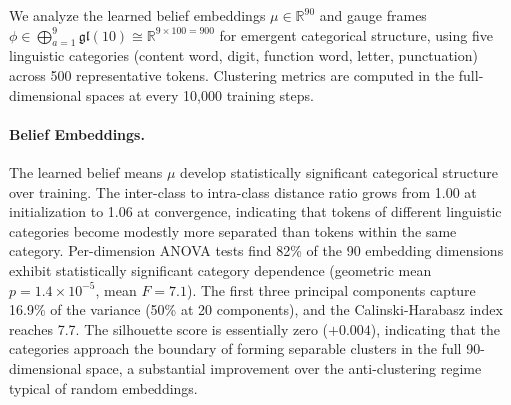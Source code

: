 \documentclass[twoside,11pt]{article}
\begin{document}
We analyze the learned belief embeddings $\mu \in \mathbb{R}^{90}$ and gauge frames $\phi \in \bigoplus_{a=1}^{9} \mathfrak{gl}(10) \cong \mathbb{R}^{9 \times 100 = 900}$ for emergent categorical structure, using five linguistic categories (content word, digit, function word, letter, punctuation) across 500 representative tokens. Clustering metrics are computed in the full-dimensional spaces at every 10{,}000 training steps.

\paragraph{Belief Embeddings.} The learned belief means $\mu$ develop statistically significant categorical structure over training. The inter-class to intra-class distance ratio grows from 1.00 at initialization to 1.06 at convergence, indicating that tokens of different linguistic categories become modestly more separated than tokens within the same category. Per-dimension ANOVA tests find 82\% of the 90 embedding dimensions exhibit statistically significant category dependence (geometric mean $p = 1.4 \times 10^{-5}$, mean $F = 7.1$). The first three principal components capture 16.9\% of the variance (50\% at 20 components), and the Calinski-Harabasz index reaches 7.7. The silhouette score is essentially zero ($+0.004$), indicating that the categories approach the boundary of forming separable clusters in the full 90-dimensional space, a substantial improvement over the anti-clustering regime typical of random embeddings.
\end{document}
